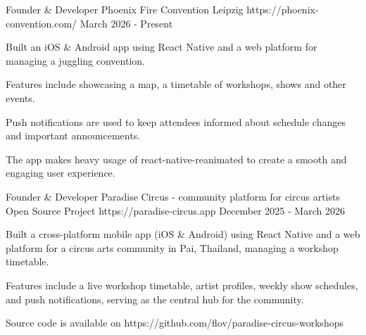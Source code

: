 

\begin{cventries}
  \cventry
    {Founder \& Developer}
    {Phoenix Fire Convention} %
    {Leipzig} %
    {https://phoenix-convention.com/} %
    {March 2026 - Present} %
    {
      \begin{cvitems} %
        \item Built an iOS \& Android app using React Native and a web platform for managing a juggling convention.
        \item Features include showcasing a map, a timetable of workshops, shows and other events.
        \item Push notifications are used to keep attendees informed about schedule changes and important announcements.
        \item The app makes heavy usage of react-native-reanimated to create a smooth and engaging user experience.
      \end{cvitems}
    }

  \cventry
    {Founder \& Developer}
    {Paradise Circus - community platform for circus artists} %
    {Open Source Project} %
    {https://paradise-circus.app} %
    {December 2025 - March 2026} %
    {
      \begin{cvitems} %
        \item Built a cross-platform mobile app (iOS \& Android) using React Native and a web platform for a circus arts community in Pai, Thailand, managing a workshop timetable.
        \item Features include a live workshop timetable, artist profiles, weekly show schedules, and push notifications, serving as the central hub for the community.
        \item Source code is available on https://github.com/flov/paradise-circus-workshops
      \end{cvitems}
    }


\end{cventries}

